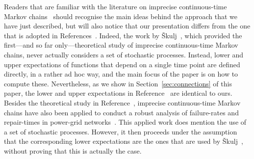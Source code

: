 \documentclass[10pt,a4paper]{paper}
\theoremstyle{definition}
\begin{document}



Readers that are familiar with the literature on imprecise continuous-time Markov chains~\cite{Skulj:2015cq,troffaes2015using} should recognise the main ideas behind the approach that we have just described, but will also notice that our presentation differs from the one that is adopted in References~\cite{Skulj:2015cq,troffaes2015using}.
Indeed, the work by {\v{S}}kulj~\cite{Skulj:2015cq}, which provided the first---and so far only---theoretical study of imprecise continuous-time Markov chains, never actually considers a set of stochastic processes. Instead, lower and upper expectations of functions that depend on a single time point are defined directly, in a rather ad hoc way, and the main focus of the paper is on how to compute these. Nevertheless, as we show in Section~\ref{sec:connections} of this paper, the lower and upper expectations in Reference~\cite{Skulj:2015cq} are identical to ours.
Besides the theoretical study in Reference~\cite{Skulj:2015cq}, imprecise continuous-time Markov chains have also been applied to conduct a robust analysis of failure-rates and repair-times in power-grid networks~\cite{troffaes2015using}. This applied work does mention the use of a set of stochastic processes. However, it then proceeds under the assumption that the corresponding lower expectations are the ones that are used by {\v{S}}kulj~\cite{Skulj:2015cq}, without proving that this is actually the case.



\end{document}
